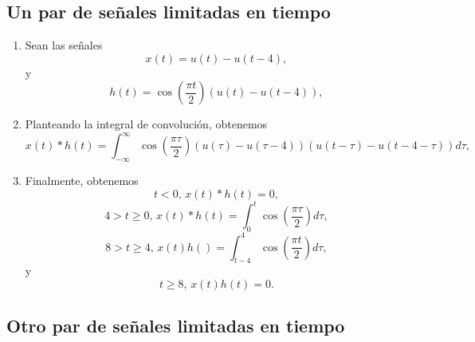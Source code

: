 \subsection{Un par de señales limitadas en tiempo}

\begin{enumerate}

\item Sean las se\~{n}ales
\begin{equation}
  x\left( t\right) =u\left( t\right) -u\left( t-4\right),
\end{equation}
y
\begin{equation}
h\left( t\right) =\cos \left( \frac{\pi t}{2}\right) \left( u\left( t\right)-u\left( t-4\right) \right),
\end{equation}

\item Planteando la integral de convolución, obtenemos
\begin{equation}
        x\left( t\right)  * h\left( t\right) =
                \int_{-\infty }^{\infty }
                        \cos \left( \frac{\pi \tau}{2}\right) 
                        \left( u\left( \tau \right) - u\left( \tau -4\right) \right)
                        \left( u\left( t-\tau \right) - u\left( t-4-\tau \right) \right) d\tau ,
\end{equation}

\item Finalmente, obtenemos
\begin{equation}
        t<0, \, x\left( t\right) * h\left( t\right) =0,
\end{equation}
\begin{equation}
        4>t\geq 0, \, x\left( t\right) * h\left( t\right) =
                \int_{0}^{t}\cos\left( \frac{\pi \tau}{2}\right) d\tau ,
\end{equation}
\begin{equation}
        8>t\geq 4, \, x\left( t \right)  h\left( \right) =
                \int_{t-4}^{4}\cos\left( \frac{\pi t}{2}\right) d\tau ,
\end{equation}
y
\begin{equation}
        t\geq 8, \, x\left( t\right)  h\left( t\right) =0.
\end{equation}

\end{enumerate}

\subsection{Otro par de señales limitadas en tiempo}


